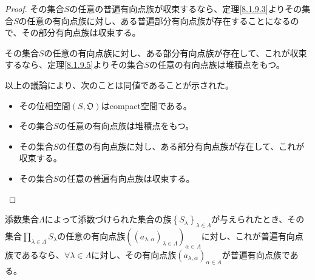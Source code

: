 \documentclass[dvipdfmx]{jsarticle}
\begin{document}
\begin{proof}
その集合$S$の任意の普遍有向点族が収束するなら、定理\ref{8.1.9.3}よりその集合$S$の任意の有向点族に対し、ある普遍部分有向点族が存在することになるので、その部分有向点族は収束する。\par
その集合$S$の任意の有向点族に対し、ある部分有向点族が存在して、これが収束するなら、定理\ref{8.1.9.5}よりその集合$S$の任意の有向点族は堆積点をもつ。\par
以上の議論により、次のことは同値であることが示された。
\begin{itemize}
\item
  その位相空間$\left( S,\mathfrak{O} \right)$はcompact空間である。
\item
  その集合$S$の任意の有向点族は堆積点をもつ。
\item
  その集合$S$の任意の有向点族に対し、ある部分有向点族が存在して、これが収束する。
\item
  その集合$S$の任意の普遍有向点族は収束する。
\end{itemize}
\end{proof}
\begin{thm}\label{8.1.9.13}
添数集合$\varLambda$によって添数づけられた集合の族$\left\{ S_{\lambda} \right\}_{\lambda \in \varLambda}$が与えられたとき、その集合$\prod_{\lambda \in \varLambda} S_{\lambda}$の任意の有向点族$\left( \left( a_{\lambda,\alpha} \right)_{\lambda \in \varLambda} \right)_{\alpha \in A}$に対し、これが普遍有向点族であるなら、$\forall\lambda \in \varLambda$に対し、その有向点族$\left( a_{\lambda,\alpha} \right)_{\alpha \in A}$が普遍有向点族である。
\end{thm}
\end{document}
